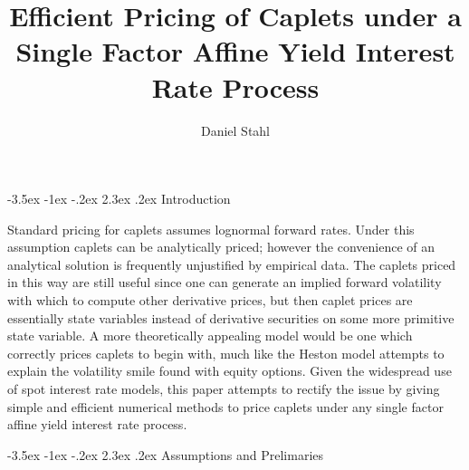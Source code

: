 \documentclass[12pt]{article}
\author{Daniel Stahl}
\title{Efficient Pricing of Caplets under a Single Factor Affine Yield Interest Rate Process}
\makeatletter
\renewcommand\section{\@startsection{section}{1}{\z@}%
                                  {-3.5ex \@plus -1ex \@minus -.2ex}%
                                  {2.3ex \@plus.2ex}%
                                  {\normalfont\large\bfseries}}
\theoremstyle{definition}
\theoremstyle{remark}
\makeatother
\begin{document}

\setlength{\parindent}{0pt}













\maketitle
{}
\section{Introduction}

Standard pricing for caplets assumes lognormal forward rates. Under this assumption caplets can be analytically priced; however the convenience of an analytical solution is frequently unjustified by empirical data.  The caplets priced in this way are still useful since one can generate an implied forward volatility with which to compute other derivative prices, but then caplet prices are essentially state variables instead of derivative securities on some more primitive state variable.  A more theoretically appealing model would be one which correctly prices caplets to begin with, much like the Heston model attempts to explain the volatility smile found with equity options.  Given the widespread use of spot interest rate models, this paper attempts to rectify the issue by giving simple and efficient numerical methods to price caplets under any single factor affine yield interest rate process.

\section{Assumptions and Prelimaries}
\end{document}
